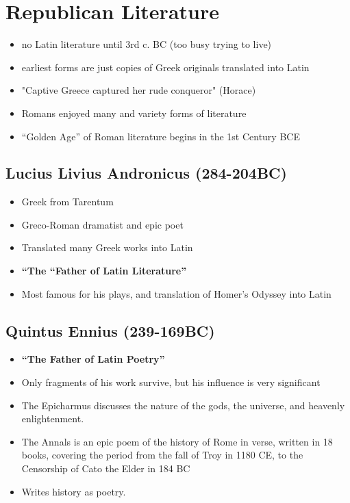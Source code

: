\documentclass[12pt, twoside]{article}
\begin{document}
\section{Republican Literature}
\begin{itemize}
\item no Latin literature until 3rd c. BC (too busy trying to live)
\item earliest forms are just copies of Greek originals translated into Latin
\item "Captive Greece captured her rude conqueror" (Horace)
\item Romans enjoyed many and variety forms of literature
\item “Golden Age” of Roman literature begins in the 1st Century BCE
\end{itemize}

\subsection{Lucius Livius Andronicus (284-204BC)}
\begin{itemize}
\item Greek from Tarentum
\item Greco-Roman dramatist and epic poet
\item Translated many Greek works into Latin
\item \textbf{“The “Father of Latin Literature”}
\item Most famous for his plays, and translation of Homer’s Odyssey into Latin
\end{itemize}

\subsection{Quintus Ennius (239-169BC)}
\begin{itemize}
\item \textbf{“The Father of Latin Poetry”}
\item Only fragments of his work survive, but his influence is very significant 
\item The Epicharmus discusses the nature of the gods, the universe, and heavenly enlightenment. 
\item The Annals is an epic poem of the history of Rome in verse, written in 18 books, covering the period from the fall of Troy in 1180 CE, to the Censorship of Cato the Elder in 184 BC
\item Writes history as poetry.
\end{itemize}
\end{document}
